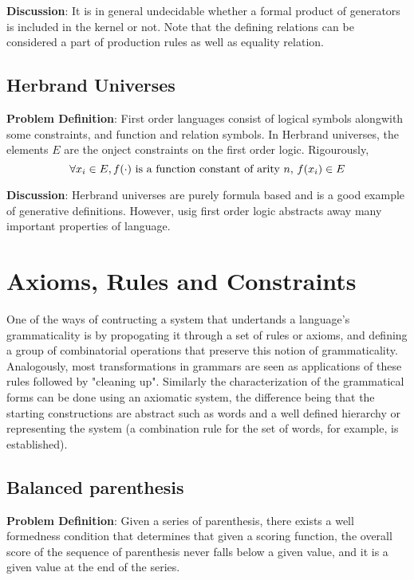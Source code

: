 \documentclass{report}
\begin{document}
\textbf{Discussion}: It is in general undecidable whether a formal product of
generators is included in the kernel or not. Note that the defining relations
can be considered a part of production rules as well as equality relation.

\subsection{Herbrand Universes}

\textbf{Problem Definition}: First order languages consist of logical symbols
alongwith some constraints, and function and relation symbols. In Herbrand
universes, the elements $E$ are the onject constraints on the first order
logic. Rigourously,
$$
\forall x_i \in E, \\
f(\cdot) \text{ is a function constant of arity } n,\, f(x_i) \in E
$$

\textbf{Discussion}: Herbrand universes are purely formula based and is a
good example of generative definitions. However, usig first order logic
abstracts away many important properties of language.

\section{Axioms, Rules and Constraints}

One of the ways of contructing a system that undertands a language's
grammaticality is by propogating it through a set of rules or axioms, and
defining a group of combinatorial operations that preserve this notion of
grammaticality. Analogously, most transformations in grammars are seen as
applications of these rules followed by "cleaning up". Similarly the
characterization of the grammatical forms can be done using an axiomatic
system, the difference being that the starting constructions are abstract
such as words and a well defined hierarchy or representing the system (a
combination rule for the set of words, for example, is established).

\subsection{Balanced parenthesis}

\textbf{Problem Definition}: Given a series of parenthesis, there exists a well
formedness condition that determines that given a scoring function, the overall
score of the sequence of parenthesis never falls below a given value, and it is
a given value at the end of the series.
\end{document}

